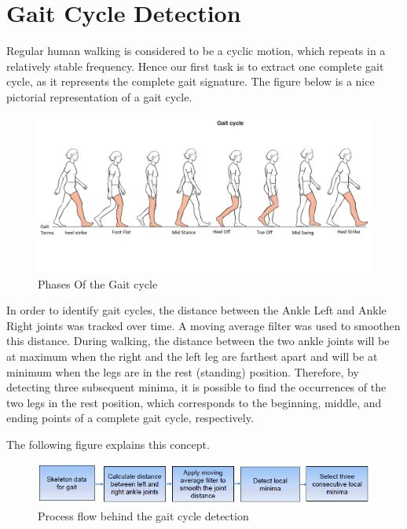 \section{Gait Cycle Detection} \label{Gait Cycle Detection} 

\noindent Regular human walking is considered to be a cyclic motion, which repeats in a relatively stable frequency. Hence our first task is to extract one complete gait cycle, as it represents the complete gait signature. The figure below is a nice pictorial representation of a gait cycle.\\


\begin{figure}[h]
\centering
\includegraphics[scale=0.3]{gaitoriginal.jpg}
\caption{Phases Of the Gait cycle}
\end{figure}
 
\noindent In order to identify gait cycles, the distance between the Ankle Left and Ankle Right joints was tracked over time. A moving average filter was used to smoothen this distance. During walking, the distance between the two ankle joints will be at maximum when the right and the left leg are farthest apart and will be at minimum when the legs are in the rest (standing) position. Therefore, by detecting three subsequent minima, it is possible to find the occurrences of the two legs in the rest position, which corresponds to the beginning, middle, and ending points of a complete gait cycle, respectively.                                         

\newpage
\noindent The following figure explains this concept.

\begin{figure}[h]
\centering
\includegraphics[scale=0.85]{bd.png}
\caption{Process flow behind the gait cycle detection}
\end{figure}

